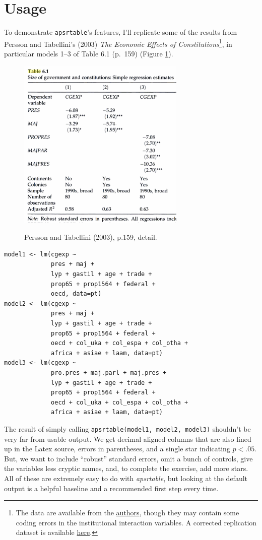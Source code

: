 \documentclass[10pt]{article} %
\begin{document}
\section{Usage}
\label{sec:usage}

To demonstrate \texttt{apsrtable}'s features, I'll replicate some of the results from Persson and Tabellini's (2003) \textit{The Economic Effects of Constitutions}\footnote{The data are available from the \href{http://www.igier.unibocconi.it/whos.php?vedi=1169&tbn=albero&id_folder=177}{authors}, though they may contain some coding errors in the institutional interaction variables. A corrected replication dataset is available \href{http://malecki.wustl.edu/pt.csv}{here}.}, in particular models 1--3 of Table 6.1 (p.~159) (Figure \ref{fig:ptimage}).
\begin{figure}[htb]
  \centering
  \caption{Persson and Tabellini (2003), p.159, detail.}
  \includegraphics[width=8cm]{pt-table.png}
  \label{fig:ptimage}
\end{figure}
\begin{verbatim}
model1 <- lm(cgexp ~ 
             pres + maj +  
             lyp + gastil + age + trade + 
             prop65 + prop1564 + federal +
             oecd, data=pt)
model2 <- lm(cgexp ~ 
             pres + maj +
             lyp + gastil + age + trade + 
             prop65 + prop1564 + federal +
             oecd + col_uka + col_espa + col_otha +
             africa + asiae + laam, data=pt)
model3 <- lm(cgexp ~ 
             pro.pres + maj.parl + maj.pres + 
             lyp + gastil + age + trade + 
             prop65 + prop1564 + federal +
             oecd + col_uka + col_espa + col_otha +
             africa + asiae + laam, data=pt)
\end{verbatim}
The result of simply calling \texttt{apsrtable(model1, model2, model3)} shouldn't be very far from usable output. We get decimal-aligned columns that are also lined up in the Latex source, errors in parentheses, and a single star indicating $p<.05$. But, we want to include ``robust'' standard errors, omit a bunch of controls, give the variables less cryptic names, and, to complete the exercise, add more stars. All of these are extremely easy to do with \emph{apsrtable}, but looking at the default output is a helpful baseline and a recommended first step every time.
\end{document}
